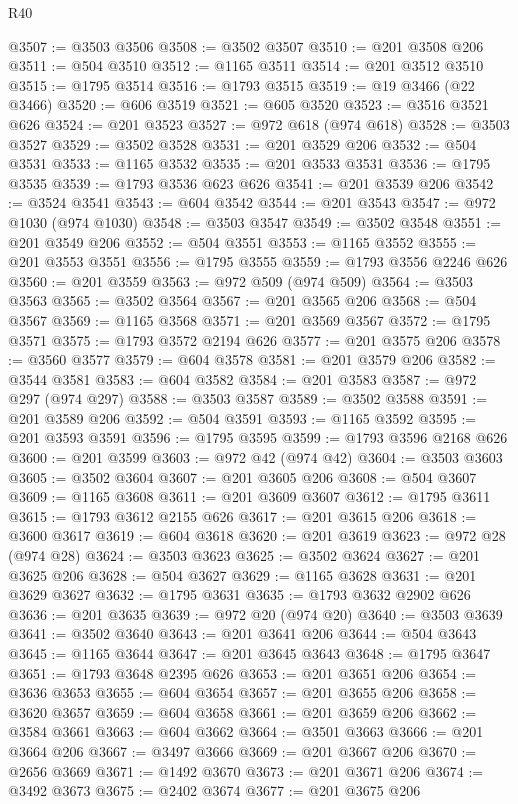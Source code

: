 \begin{lexlean}{R40}
\begin{coremodule}
@3507 := @3503 @3506
@3508 := @3502 @3507
@3510 := @201 @3508 @206
@3511 := @504 @3510
@3512 := @1165 @3511
@3514 := @201 @3512 @3510
@3515 := @1795 @3514
@3516 := @1793 @3515
@3519 := @19 @3466 (@22 @3466)
@3520 := @606 @3519
@3521 := @605 @3520
@3523 := @3516 @3521 @626
@3524 := @201 @3523
@3527 := @972 @618 (@974 @618)
@3528 := @3503 @3527
@3529 := @3502 @3528
@3531 := @201 @3529 @206
@3532 := @504 @3531
@3533 := @1165 @3532
@3535 := @201 @3533 @3531
@3536 := @1795 @3535
@3539 := @1793 @3536 @623 @626
@3541 := @201 @3539 @206
@3542 := @3524 @3541
@3543 := @604 @3542
@3544 := @201 @3543
@3547 := @972 @1030 (@974 @1030)
@3548 := @3503 @3547
@3549 := @3502 @3548
@3551 := @201 @3549 @206
@3552 := @504 @3551
@3553 := @1165 @3552
@3555 := @201 @3553 @3551
@3556 := @1795 @3555
@3559 := @1793 @3556 @2246 @626
@3560 := @201 @3559
@3563 := @972 @509 (@974 @509)
@3564 := @3503 @3563
@3565 := @3502 @3564
@3567 := @201 @3565 @206
@3568 := @504 @3567
@3569 := @1165 @3568
@3571 := @201 @3569 @3567
@3572 := @1795 @3571
@3575 := @1793 @3572 @2194 @626
@3577 := @201 @3575 @206
@3578 := @3560 @3577
@3579 := @604 @3578
@3581 := @201 @3579 @206
@3582 := @3544 @3581
@3583 := @604 @3582
@3584 := @201 @3583
@3587 := @972 @297 (@974 @297)
@3588 := @3503 @3587
@3589 := @3502 @3588
@3591 := @201 @3589 @206
@3592 := @504 @3591
@3593 := @1165 @3592
@3595 := @201 @3593 @3591
@3596 := @1795 @3595
@3599 := @1793 @3596 @2168 @626
@3600 := @201 @3599
@3603 := @972 @42 (@974 @42)
@3604 := @3503 @3603
@3605 := @3502 @3604
@3607 := @201 @3605 @206
@3608 := @504 @3607
@3609 := @1165 @3608
@3611 := @201 @3609 @3607
@3612 := @1795 @3611
@3615 := @1793 @3612 @2155 @626
@3617 := @201 @3615 @206
@3618 := @3600 @3617
@3619 := @604 @3618
@3620 := @201 @3619
@3623 := @972 @28 (@974 @28)
@3624 := @3503 @3623
@3625 := @3502 @3624
@3627 := @201 @3625 @206
@3628 := @504 @3627
@3629 := @1165 @3628
@3631 := @201 @3629 @3627
@3632 := @1795 @3631
@3635 := @1793 @3632 @2902 @626
@3636 := @201 @3635
@3639 := @972 @20 (@974 @20)
@3640 := @3503 @3639
@3641 := @3502 @3640
@3643 := @201 @3641 @206
@3644 := @504 @3643
@3645 := @1165 @3644
@3647 := @201 @3645 @3643
@3648 := @1795 @3647
@3651 := @1793 @3648 @2395 @626
@3653 := @201 @3651 @206
@3654 := @3636 @3653
@3655 := @604 @3654
@3657 := @201 @3655 @206
@3658 := @3620 @3657
@3659 := @604 @3658
@3661 := @201 @3659 @206
@3662 := @3584 @3661
@3663 := @604 @3662
@3664 := @3501 @3663
@3666 := @201 @3664 @206
@3667 := @3497 @3666
@3669 := @201 @3667 @206
@3670 := @2656 @3669
@3671 := @1492 @3670
@3673 := @201 @3671 @206
@3674 := @3492 @3673
@3675 := @2402 @3674
@3677 := @201 @3675 @206

\end{coremodule}
\end{lexlean}

